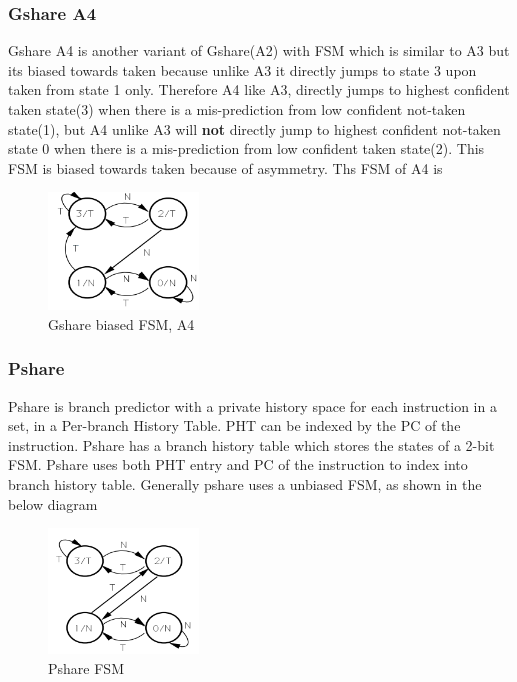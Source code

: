 \documentclass[a4paper]{article}
\begin{document}
        \subsubsection{Gshare A4}
            Gshare A4 is another variant of Gshare(A2) with FSM which is similar to A3 but its biased towards taken because unlike A3 it directly jumps to state 3 upon taken from state 1 only. Therefore A4 like A3, directly jumps to highest confident taken state(3) when there is a mis-prediction from low confident not-taken state(1), but A4 unlike A3 will  \textbf{not} directly jump to highest confident not-taken state 0 when there is a mis-prediction from low confident taken state(2). This FSM is biased towards taken because of asymmetry. Ths FSM of A4 is
            \begin{figure}[ht]
                \centerline{\includegraphics[width= 4cm]{images/veerendra/gshare_a4.png}}
                \caption{Gshare biased FSM, A4}
                \label{fig_gshare_a4}
            \end{figure}
            
        \subsubsection{Pshare}
            Pshare is branch predictor with a private history space for each instruction in a set, in a Per-branch History Table. PHT can be indexed by the PC of the instruction. Pshare has a branch history table which stores the states of a 2-bit FSM. Pshare uses both PHT entry and PC of the instruction to index into branch history table.
            Generally pshare uses a unbiased FSM, as shown in the below diagram
            \begin{figure}[ht]
                \centerline{\includegraphics[width= 4cm]{images/veerendra/gshare_a2.png}}
                \caption{ Pshare FSM}
                \label{fig_pshare_fsm}
            \end{figure}
            
\end{document}
